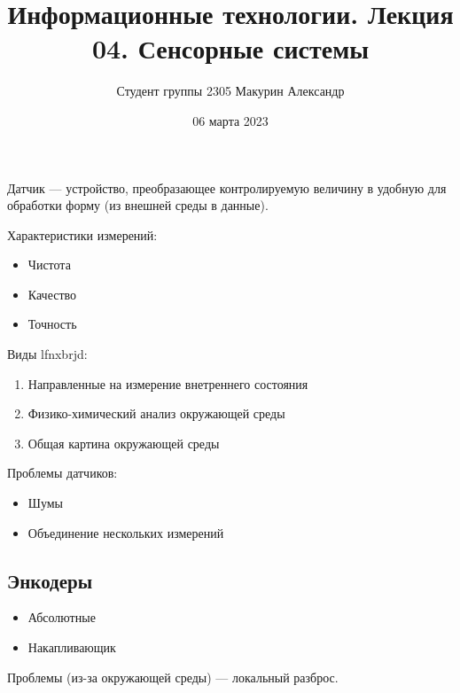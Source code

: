 \documentclass{article}
\title{Информационные технологии. Лекция 04. Сенсорные системы}
\author{Студент группы 2305 Макурин Александр}
\date{06 марта 2023}
\begin{document}
\maketitle
\begin{sloppypar}
    Датчик — устройство, преобразающее контролируемую величину в удобную для обработки форму (из внешней среды в данные).

    Характеристики измерений:
    \begin{itemize}
        \item Чистота
        \item Качество
        \item Точность
    \end{itemize}

    Виды lfnxbrjd:
    \begin{enumerate}
        \item Направленные на измерение внетреннего состояния
        \item Физико-химический анализ окружающей среды
        \item Общая картина окружающей среды
    \end{enumerate}

    Проблемы датчиков:
    \begin{itemize}
        \item Шумы
        \item Объединение нескольких измерений
    \end{itemize}

    \subsection*{Энкодеры}
    \begin{itemize}
        \item Абсолютные
        \item Накапливающик
    \end{itemize}

    Проблемы (из-за окружающей среды) — локальный разброс.

\end{sloppypar}
\end{document}
